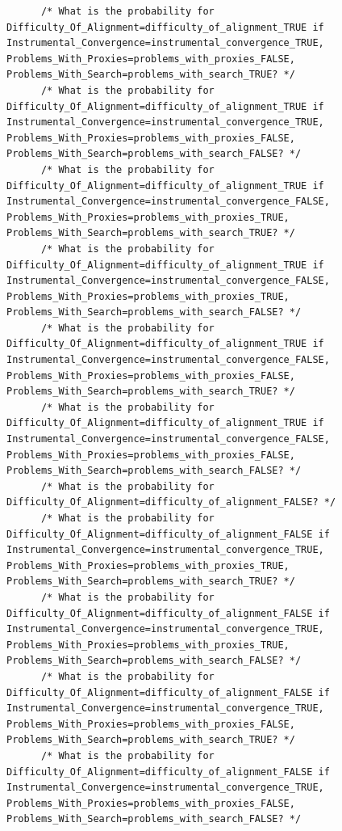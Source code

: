 \documentclass[
  11pt,
  letterpaper,
]{book}
\begin{document}
\begin{landscape}
\begin{verbatim}
      /* What is the probability for Difficulty_Of_Alignment=difficulty_of_alignment_TRUE if Instrumental_Convergence=instrumental_convergence_TRUE, Problems_With_Proxies=problems_with_proxies_FALSE, Problems_With_Search=problems_with_search_TRUE? */
      /* What is the probability for Difficulty_Of_Alignment=difficulty_of_alignment_TRUE if Instrumental_Convergence=instrumental_convergence_TRUE, Problems_With_Proxies=problems_with_proxies_FALSE, Problems_With_Search=problems_with_search_FALSE? */
      /* What is the probability for Difficulty_Of_Alignment=difficulty_of_alignment_TRUE if Instrumental_Convergence=instrumental_convergence_FALSE, Problems_With_Proxies=problems_with_proxies_TRUE, Problems_With_Search=problems_with_search_TRUE? */
      /* What is the probability for Difficulty_Of_Alignment=difficulty_of_alignment_TRUE if Instrumental_Convergence=instrumental_convergence_FALSE, Problems_With_Proxies=problems_with_proxies_TRUE, Problems_With_Search=problems_with_search_FALSE? */
      /* What is the probability for Difficulty_Of_Alignment=difficulty_of_alignment_TRUE if Instrumental_Convergence=instrumental_convergence_FALSE, Problems_With_Proxies=problems_with_proxies_FALSE, Problems_With_Search=problems_with_search_TRUE? */
      /* What is the probability for Difficulty_Of_Alignment=difficulty_of_alignment_TRUE if Instrumental_Convergence=instrumental_convergence_FALSE, Problems_With_Proxies=problems_with_proxies_FALSE, Problems_With_Search=problems_with_search_FALSE? */
      /* What is the probability for Difficulty_Of_Alignment=difficulty_of_alignment_FALSE? */
      /* What is the probability for Difficulty_Of_Alignment=difficulty_of_alignment_FALSE if Instrumental_Convergence=instrumental_convergence_TRUE, Problems_With_Proxies=problems_with_proxies_TRUE, Problems_With_Search=problems_with_search_TRUE? */
      /* What is the probability for Difficulty_Of_Alignment=difficulty_of_alignment_FALSE if Instrumental_Convergence=instrumental_convergence_TRUE, Problems_With_Proxies=problems_with_proxies_TRUE, Problems_With_Search=problems_with_search_FALSE? */
      /* What is the probability for Difficulty_Of_Alignment=difficulty_of_alignment_FALSE if Instrumental_Convergence=instrumental_convergence_TRUE, Problems_With_Proxies=problems_with_proxies_FALSE, Problems_With_Search=problems_with_search_TRUE? */
      /* What is the probability for Difficulty_Of_Alignment=difficulty_of_alignment_FALSE if Instrumental_Convergence=instrumental_convergence_TRUE, Problems_With_Proxies=problems_with_proxies_FALSE, Problems_With_Search=problems_with_search_FALSE? */

\end{verbatim}
\end{landscape}
\end{document}
